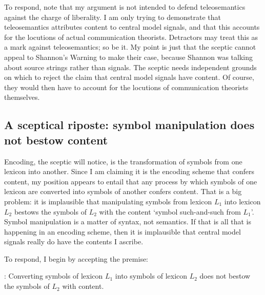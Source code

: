 \documentclass[12pt]{article}
\begin{document}
To respond, note that my argument is not intended to defend teleosemantics against the charge of liberality.
I am only trying to demonstrate that teleosemantics attributes content to central model signals, and that this accounts for the locutions of actual communication theorists.
Detractors may treat this as a mark against teleosemantics; so be it.
My point is just that the sceptic cannot appeal to {\sc Shannon's Warning} to make their case, because Shannon was talking about source strings rather than signals.
The sceptic needs independent grounds on which to reject the claim that central model signals have content.
Of course, they would then have to account for the locutions of communication theorists themselves.


\subsection{A sceptical riposte: symbol manipulation does not bestow content}

Encoding, the sceptic will notice, is the transformation of symbols from one lexicon into another.
Since I am claiming it is the encoding scheme that confers content, my position appears to entail that any process by which symbols of one lexicon are converted into symbols of another confers content.
That is a big problem: it is implausible that manipulating symbols from lexicon $L_1$ into lexicon $L_2$ bestows the symbols of $L_2$ with the content `symbol such-and-such from $L_1$'.
Symbol manipulation is a matter of syntax, not semantics.
If that is all that is happening in an encoding scheme, then it is implausible that central model signals really do have the contents I ascribe.

To respond, I begin by accepting the premise:

\begin{myquote}
\smi{}: Converting symbols of lexicon $L_1$ into symbols of lexicon $L_2$ does not bestow the symbols of $L_2$ with content.
\end{myquote}
\end{document}
